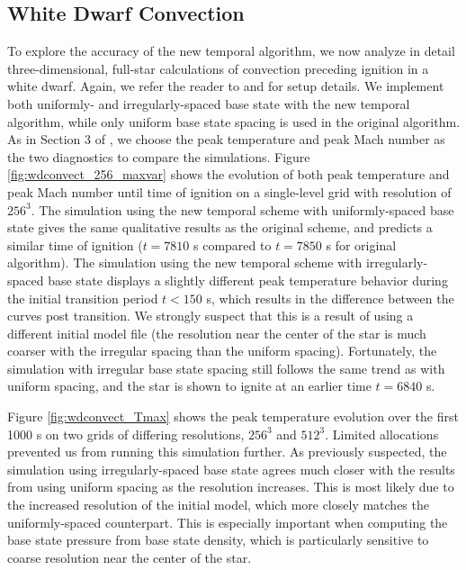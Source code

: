 \documentclass{aastex62}
\begin{document}
\subsection{White Dwarf Convection}\label{sec:whitedwarf}

To explore the accuracy of the new temporal algorithm, we now analyze in detail three-dimensional, full-star calculations of convection preceding ignition in a white dwarf. Again, we refer the reader to \cite{MAESTRO_AMR} and \cite{MAESTRO_convection} for setup details. We implement both uniformly- and irregularly-spaced base state with the new temporal algorithm, while only uniform base state spacing is used in the original algorithm. As in Section 3 of \cite{MAESTRO_AMR}, we choose the peak temperature and peak Mach number as the two diagnostics to compare the simulations. Figure \ref{fig:wdconvect_256_maxvar} shows the evolution of both peak temperature and peak Mach number until time of ignition on a single-level grid with resolution of $256^3$. The simulation using the new temporal scheme with uniformly-spaced base state gives the same qualitative results as the original scheme, and predicts a similar time of ignition ($t=7810$ s compared to $t=7850$ s for original algorithm). The simulation using the new temporal scheme with irregularly-spaced base state displays a slightly different peak temperature behavior during the initial transition period $t<150$ s, which results in the difference between the curves post transition. We strongly suspect that this is a result of using a different initial model file (the resolution near the center of the star is much coarser with the irregular spacing than the uniform spacing). Fortunately, the simulation with irregular base state spacing still follows the same trend as with uniform spacing, and the star is shown to ignite at an earlier time $t=6840$ s.

Figure \ref{fig:wdconvect_Tmax} shows the peak temperature evolution over the first 1000 s on two grids of differing resolutions, $256^3$ and $512^3$.
Limited allocations prevented us from running this simulation further.
As previously suspected, the simulation using irregularly-spaced base state agrees much closer with the results from using uniform spacing as the resolution increases.
This is most likely due to the increased resolution of the initial model, which more closely matches the uniformly-spaced counterpart.
This is especially important when computing the base state pressure from base state density, which is particularly sensitive to coarse resolution near the center of the star.
\end{document}
